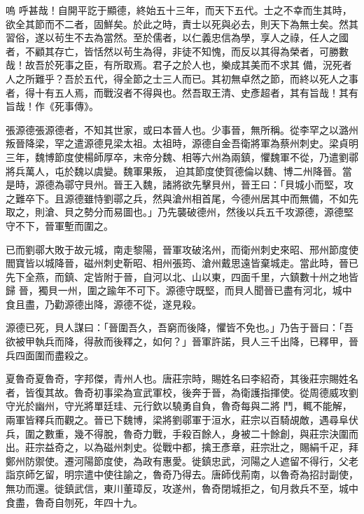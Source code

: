 
\begin{pinyinscope}

 嗚
 呼甚哉！自開平訖于顯德，終始五十三年，而天下五代。士之不幸而生其時，欲全其節而不二者，固鮮矣。於此之時，責士以死與必去，則天下為無士矣。然其習俗，遂以茍生不去為當然。至於儒者，以仁義忠信為學，享人之祿，任人之國者，不顧其存亡，皆恬然以茍生為得，非徒不知愧，而反以其得為榮者，可勝數哉！故吾於死事之臣，有所取焉。君子之於人也，樂成其美而不求其
 備，況死者人之所難乎？吾於五代，得全節之士三人而已。其初無卓然之節，而終以死人之事者，得十有五人焉，而戰沒者不得與也。然吾取王清、史彥超者，其有旨哉！其有旨哉！作《死事傳》。



 張源德張源德者，不知其世家，或曰本晉人也。少事晉，無所稱。從李罕之以潞州叛晉降梁，罕之遣源德見梁太祖。太祖時，源德自金吾衛將軍為蔡州刺史。梁貞明三年，魏博節度使楊師厚卒，末帝分魏、相等六州為兩鎮，懼魏軍不從，乃遣劉鄩將兵萬人，屯於魏以虞變。魏軍果叛，
 迫其節度使賀德倫以魏、博二州降晉。當是時，源德為鄩守貝州。晉王入魏，諸將欲先擊貝州，晉王曰：「貝城小而堅，攻之難卒下。且源德雖恃劉鄩之兵，然與滄州相首尾，今德州居其中而無備，不如先取之，則滄、貝之勢分而易圖也。」乃先襲破德州，然後以兵五千攻源德，源德堅守不下，晉軍塹而圍之。



 已而劉鄩大敗于故元城，南走黎陽，晉軍攻破洺州，而衛州刺史來昭、邢州節度使閻寶皆以城降晉，磁州刺史靳昭、相州張筠、滄州戴思遠皆棄城走。當此時，晉已先下全燕，而鎮、定皆附于晉，自河以北、山以東，四面千里，六鎮數十州之地皆歸
 晉，獨貝一州，圍之踰年不可下。源德守既堅，而貝人聞晉已盡有河北，城中食且盡，乃勸源德出降，源德不從，遂見殺。



 源德已死，貝人謀曰：「晉圍吾久，吾窮而後降，懼皆不免也。」乃告于晉曰：「吾欲被甲執兵而降，得赦而後釋之，如何？」晉軍許諾，貝人三千出降，已釋甲，晉兵四面圍而盡殺之。



 夏魯奇夏魯奇，字邦傑，青州人也。唐莊宗時，賜姓名曰李紹奇，其後莊宗賜姓名者，皆復其故。魯奇初事梁為宣武軍校，後奔于晉，為衛護指揮使。從周德威攻劉守光於幽州，守光將單廷珪、元行欽以驍勇自負，魯奇每與二將
 鬥，輒不能解，兩軍皆釋兵而觀之。晉已下魏博，梁將劉鄩軍于洹水，莊宗以百騎覘敵，遇尋阜伏兵，圍之數重，幾不得脫，魯奇力戰，手殺百餘人，身被二十餘創，與莊宗決圍而出。莊宗益奇之，以為磁州刺史。從戰中都，擒王彥章，莊宗壯之，賜絹千疋，拜鄭州防禦使。遷河陽節度使，為政有惠愛。徙鎮忠武，河陽之人遮留不得行，父老詣京師乞留，明宗遣中使往諭之，魯奇乃得去。唐師伐荊南，以魯奇為招討副使，無功而還。徙鎮武信，東川董璋反，攻遂州，魯奇閉城拒之，旬月救兵不至，城中食盡，魯奇自刎死，年四十九。




\end{pinyinscope}
